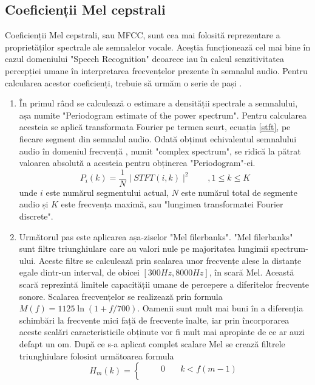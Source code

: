 \documentclass[a4paper,12pt]{book}
\begin{document}
			\subsection{Coeficienții Mel cepstrali}
				Coeficienții Mel cepstrali, sau MFCC, sunt cea mai folosită reprezentare a proprietăților spectrale ale semnalelor vocale. Aceștia funcționează cel mai bine în cazul domeniului "Speech Recognition" deoarece iau în calcul senzitivitatea percepției umane în interpretarea frecvențelor prezente în semnalul audio. Pentru calcularea acestor coeficienți, trebuie să urmăm o serie de pași \cite{mcs}.
					\begin{enumerate}
						\item 
							În primul rând se calculează o estimare a densității spectrale a semnalului, așa numite "Periodogram estimate of the power spectrum". Pentru calcularea acesteia se aplică transformata Fourier pe termen scurt, ecuația \ref{stft}, pe fiecare segment din semnalul audio. Odată obținut echivalentul semnalului audio în domeniul frecvență , numit "complex spectrum", se ridică la pătrat valoarea absolută a acesteia pentru obținerea "Periodogram"-ei.
							\begin{equation*}
								P_i(k) =\frac{1}{N}\mid STFT(i, k)\mid^2 \quad\quad,1\leq k\leq K
							\end{equation*}
							unde $i$ este numărul segmentului actual, $N$ este numărul total de segmente audio și $K$ este frecvența maximă, sau "lungimea transformatei Fourier discrete".
							\item Următorul pas este aplicarea așa-ziselor "Mel filerbanks". "Mel filerbanks" sunt filtre triunghiulare care au valori nule pe majoritatea lungimii spectrum-ului. Aceste filtre se calculează prin scalarea unor frecvențe alese la distanțe egale dintr-un interval, de obicei $[300Hz, 8000Hz]$, în scară Mel. Această scară reprezintă limitele capacității umane de percepere a diferitelor frecvente sonore. Scalarea frecvențelor se realizează prin formula $M(f) = 1125 \ln(1+ f/700)$. Oamenii sunt mult mai buni în a diferenția schimbări la frecvente mici față de frecvente înalte, iar prin încorporarea aceste scalări caracteristicile obținute vor fi mult mai apropiate de ce ar auzi defapt un om. \newline
							După ce s-a aplicat complet scalare Mel se crează filtrele triunghiulare folosint următoarea formula
						\begin{equation*}
							H_m(k) = 
							\begin{cases}
							\quad \quad 0&\quad k<f(m-1) \\[3pt]

\end{cases}
\end{equation*}
\end{enumerate}
\end{document}
